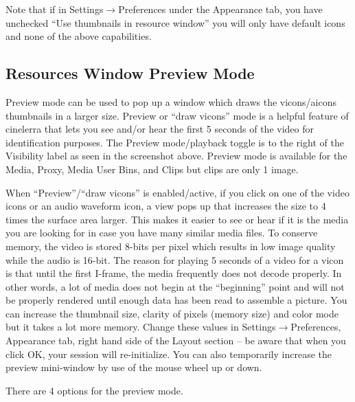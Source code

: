Note that if in Settings$\rightarrow$Preferences under the Appearance tab, you have unchecked “Use thumbnails in resource window” you will only have default icons and none of the above capabilities.


\subsection{Resources Window Preview Mode}%
\label{sub:resources_window_preview_mode}


Preview mode can be used to pop up a window which draws the vicons/aicons thumbnails in a larger size.  
Preview or “draw vicons” mode is a helpful feature of cinelerra that lets you see and/or hear the first 5 seconds of the video for identification purposes. 
The Preview mode/playback toggle is to the right of the Visibility label as seen in the screenshot above. 
Preview mode is available for the Media, Proxy, Media User Bins, and Clips but clips are only 1 image.

When “Preview”/“draw vicons” is enabled/active, if you click on one of the video icons or an audio waveform icon, a view pops up that increases the size to 4 times the surface area larger. 
This makes it easier to see or hear if it is the media you are looking for in case you have many similar media files. 
To conserve memory, the video is stored 8-bits per pixel which results in low image quality while the audio is 16-bit. 
The reason for playing 5 seconds of a video for a vicon is that until the first I-frame, the media frequently does not decode properly.  
In other words, a lot of media does not begin at the “beginning” point and will not be properly rendered until enough data has been read to assemble a picture.  
You can increase the thumbnail size, clarity of pixels (memory size) and color mode but it takes a lot more memory.  
Change these values in Settings$\rightarrow$Preferences, Appearance tab, right hand side of the Layout section – be aware that when you click OK, your session will re-initialize.  
You can also temporarily increase the preview mini-window by use of the mouse wheel up or down.

There are 4 options for the preview mode.

